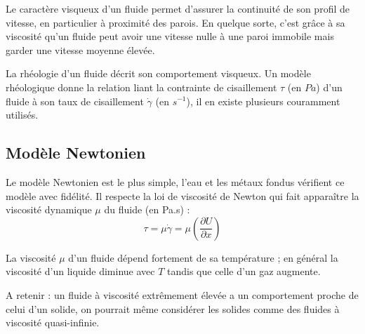 Le caractère visqueux d'un fluide permet d'assurer la continuité de son profil de vitesse, en particulier à proximité des parois. En quelque sorte, c'est grâce à sa viscosité qu'un fluide peut avoir une vitesse nulle à une paroi immobile mais garder une vitesse moyenne élevée.

La rhéologie d'un fluide décrit son comportement visqueux. Un modèle rhéologique donne la relation liant la contrainte de cisaillement $\tau$ (en $Pa$) d'un fluide à son taux de cisaillement $\dot{\gamma}$ (en $s^{-1}$), il en existe plusieurs couramment utilisés.


\subsection{Modèle Newtonien}

Le modèle Newtonien est le plus simple, l'eau et les métaux fondus vérifient ce modèle avec fidélité. Il respecte la loi de viscosité de Newton qui fait apparaître la viscosité dynamique $\mu$ du fluide (en Pa.s) :
%
\begin{equation}
\tau = \mu \dot{\gamma} = \mu \left( \frac{\partial U}{\partial x} \right)
\end{equation}

La viscosité $\mu$ d'un fluide dépend fortement de sa température ; en général la viscosité d'un liquide diminue avec $T$ tandis que celle d'un gaz augmente.

A retenir : un fluide à viscosité extrêmement élevée a un comportement proche de celui d'un solide, on pourrait même considérer les solides comme des fluides à viscosité quasi-infinie.
